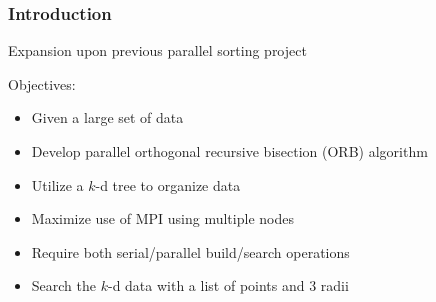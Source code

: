 \documentclass[usernames,dvipsnames]{beamer}
\begin{document}
\begin{frame}	
    \frametitle{Introduction}
    	
    	Expansion upon previous parallel sorting project
    	
    	\vspace{10pt}
    	
    	\begin{block}{Objectives:}
    		\begin{itemize}
    			\item Given a large set of data
    			\item Develop parallel orthogonal recursive bisection (ORB) algorithm
    			\item Utilize a $k$-d tree to organize data
    			\item Maximize use of MPI using multiple nodes
    			\item Require both serial/parallel build/search operations
    			\item Search the $k$-d data with a list of points and 3 radii
    		\end{itemize}
    	\end{block}
\end{frame}
\end{document}
